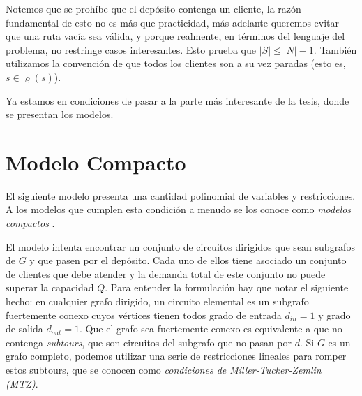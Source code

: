Notemos que se prohíbe que el depósito contenga un cliente, la razón fundamental de esto no es más que practicidad, más adelante queremos evitar que una ruta vacía sea válida, y porque realmente, en términos del lenguaje del problema, no restringe casos interesantes. Esto prueba que $|S| \leq |N|-1$. También utilizamos la convención de que todos los clientes son a su vez paradas (esto es, $s \in \varrho(s)$). 

Ya estamos en condiciones de pasar a la parte más interesante de la tesis, donde se presentan los modelos.


\section{Modelo Compacto}
\label{section:compacto}

El siguiente modelo presenta una cantidad polinomial de variables y restricciones. A los modelos que cumplen esta condición a menudo se los conoce como \emph{modelos compactos} \cite[p.3]{lancia-serafini}.

El modelo intenta encontrar un conjunto de circuitos dirigidos que sean subgrafos de $G$ y que pasen por el depósito. Cada uno de ellos tiene asociado un conjunto de clientes que debe atender y la demanda total de este conjunto no puede superar la capacidad $Q$. Para entender la formulación hay que notar el siguiente hecho: en cualquier grafo dirigido, un circuito elemental es un subgrafo fuertemente conexo cuyos vértices tienen todos grado de entrada $d_{in}=1$ y grado de salida $d_{out}=1$. Que el grafo sea fuertemente conexo es equivalente a que no contenga \emph{subtours}, que son circuitos del subgrafo que no pasan por $d$. Si $G$ es un grafo completo, podemos utilizar una serie de restricciones lineales para romper estos subtours, que se conocen como \emph{condiciones de Miller-Tucker-Zemlin (MTZ)}.  

